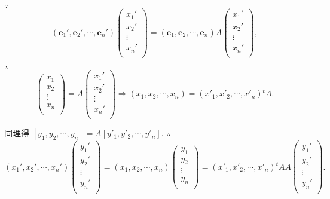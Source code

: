 \documentclass{ctexart}
\begin{document}
$\because$
\[(\boldsymbol{e}_1',\boldsymbol{e}_2',\cdots,\boldsymbol{e}_n')\begin{pmatrix}
    x_1' \\
    x_2' \\
    \vdots \\
    x_n' \\
\end{pmatrix}=(\boldsymbol{e}_1,\boldsymbol{e}_2,\cdots,\boldsymbol{e}_n)A\begin{pmatrix}
    x_1' \\
    x_2' \\
    \vdots \\
    x_n' \\
\end{pmatrix},\]

$\therefore$
\[\begin{pmatrix}
    x_1 \\
    x_2 \\
    \vdots \\
    x_n \\
\end{pmatrix}=A\begin{pmatrix}
    x_1' \\
    x_2' \\
    \vdots \\
    x_n' \\
\end{pmatrix}\Rightarrow(x_1,x_2,\cdots,x_n)=(x'_1,x'_2,\cdots,x'_n){}^tA.\]

同理得 $[y_1,y_2,\cdots,y_n]=A[y'_1,y'_2,\cdots,y'_n]$. $\therefore$
\[(x_1',x_2',\cdots,x_n')\begin{pmatrix}
    y_1' \\
    y_2' \\
    \vdots \\
    y_n' \\
\end{pmatrix}=(x_1,x_2,\cdots,x_n)\begin{pmatrix}
    y_1 \\
    y_2 \\
    \vdots \\
    y_n \\
\end{pmatrix}=(x'_1,x'_2,\cdots,x'_n){}^tAA\begin{pmatrix}
    y_1' \\
    y_2' \\
    \vdots \\
    y_n' \\
\end{pmatrix}.\]
\end{document}
